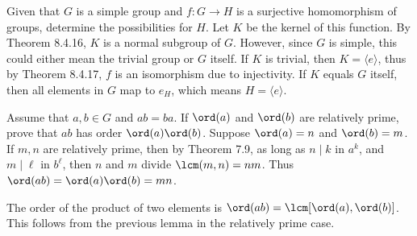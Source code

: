 \begin{problem}[Exercise 13]{
    Given that $G$ is a simple group and $f : G \to H$ is a surjective homomorphism of groups, determine the possibilities for $H$.
}
    Let $K$ be the kernel of this function.
    By Theorem 8.4.16, $K$ is a normal subgroup of $G$.
    However, since $G$ is simple, this could either mean the trivial group or $G$ itself.
    If $K$ is trivial, then $K = \langle e \rangle$, thus by Theorem 8.4.17, $f$ is an isomorphism due to injectivity.
    If $K$ equals $G$ itself, then all elements in $G$ map to $e_H$, which means $H = \langle e \rangle$.
\end{problem}

\begin{lemma}[Exercise 7.2.33]{
    Assume that $a,b \in G$ and $ab = ba$.
    If $\ord(a)$ and $\ord(b)$ are relatively prime, prove that $ab$ has order $\ord(a)\ord(b)$.
}
    Suppose $\ord(a) = n$ and $\ord(b) = m$.
    If $m,n$ are relatively prime, then by Theorem 7.9, as long as $n \mid k$ in $a^k$, and $m \mid \ell$ in $b^\ell$, then $n$ and $m$ divide $\lcm(m,n) = nm$.
    Thus $\ord(ab) = \ord(a)\ord(b) = mn$.
\end{lemma}

\begin{corollary}{
    The order of the product of two elements is $\ord(ab) = \lcm[\ord(a),\ord(b)]$.
}
    This follows from the previous lemma in the relatively prime case.
\end{corollary}

